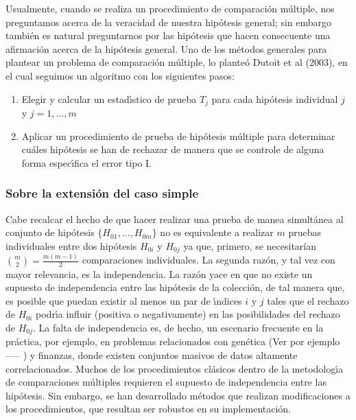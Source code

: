 \documentclass{article}
\theoremstyle{definition}
\begin{document}
Usualmente, cuando se realiza un procedimiento de comparación múltiple, nos preguntamos acerca de la veracidad de nuestra hipótesis general; sin embargo también es natural preguntarnos por las hipótesis que hacen consecuente una afirmación acerca de la hipótesis general. Uno de los métodos generales para plantear un problema de comparación múltiple, lo planteó Dutoit et al (2003), en el cual seguimos un algoritmo con los siguientes pasos:

\begin{enumerate}[I]
	\item Elegir y calcular un estadı́stico de prueba $T_j$ para cada hipótesis individual $j$ y $j=1,\dots,m$
	\item Aplicar un procedimiento de prueba de hipótesis múltiple para determinar cuáles hipótesis se han
	de rechazar de manera que se controle de alguna forma especı́fica el error tipo I.
\end{enumerate}
\subsubsection{Sobre la extensión del caso simple}
Cabe recalcar el hecho de que hacer realizar una prueba de manea simultánea al conjunto de hipótesis $\{H_{01},\dots,H_{0m}\}$ no es equivalente a realizar $m$ pruebas individuales entre dos hipótesis $H_{0i}$ y $H_{0j}$ ya que, primero, se necesitarían ${m\choose2}=\frac{m(m-1)}{2}$ comparaciones individuales. La segunda razón, y tal vez con mayor relevancia, es la independencia.
La razón yace en que no existe un supuesto de
independencia entre las hipótesis de la colección, de tal manera que, es posible que puedan existir al
menos un par de ı́ndices $i$ y $j$ tales que el rechazo de $H_{0i}$ podrı́a influir (positiva o negativamente) en las
posibilidades del rechazo de $H_{0j}$. La falta de independencia es, de hecho, un escenario frecuente en la
práctica, por ejemplo, en problemas relacionados con genética (Ver por ejemplo -----%
) y finanzas, donde existen conjuntos masivos
de datos altamente correlacionados. Muchos de los procedimientos clásicos dentro de la metodologı́a de
comparaciones múltiples requieren el supuesto de independencia entre las hipótesis. Sin embargo, se han desarrollado métodos  que realizan modificaciones a los procedimientos, que resultan ser robustos en su implementación.
\end{document}
